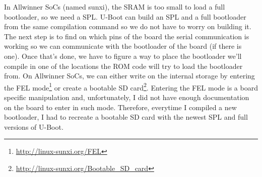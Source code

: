 In Allwinner SoCs (named sunxi), the SRAM is too small to load a full bootloader, so we need a SPL. U-Boot can build an SPL and a full bootloader from the same compilation command so we do not have to worry on building it. The next step is to find on which pins of the board the serial communication is working so we can communicate with the bootloader of the board (if there is one). Once that's done, we have to figure a way to place the bootloader we'll compile in one of the locations the ROM code will try to load the bootloader from. On Allwinner SoCs, we can either write on the internal storage by entering the FEL mode\footnote{\url{http://linux-sunxi.org/FEL}} or create a bootable SD card\footnote{\url{http://linux-sunxi.org/Bootable\_SD\_card}}. Entering the FEL mode is a board specific manipulation and, unfortunately, I did not have enough documentation on the board to enter in such mode. Therefore, everytime I compiled a new bootloader, I had to recreate a bootable SD card with the newest SPL and full versions of U-Boot.

